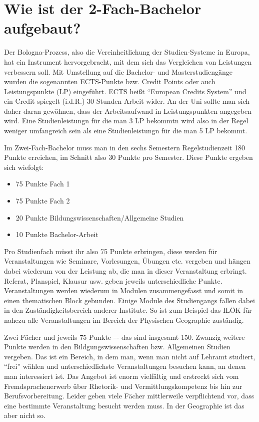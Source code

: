 \section*{Wie ist der 2-Fach-Bachelor aufgebaut?}
Der Bologna-Prozess, also die Vereinheitlichung der Studien-Systeme in Europa, hat ein Instrument hervorgebracht, mit dem sich das Vergleichen von Leistungen verbessern soll. Mit Umstellung auf die Bachelor- und Masterstudiengänge wurden die sogenannten ECTS-Punkte bzw. Credit Points oder auch Leistungspunkte (LP) eingeführt. ECTS heißt "`European Credits System"' und ein Credit spiegelt (i.d.R.) 30 Stunden Arbeit wider. An der Uni sollte man sich daher daran gewöhnen, dass der Arbeitsaufwand in Leistungspunkten angegeben wird. Eine Studienleistungn für die man 3 LP bekommtn wird also in der Regel weniger umfangreich sein als eine Studienleistungn für die man 5 LP bekommt.

Im Zwei-Fach-Bachelor muss man in den sechs Semestern Regelstudienzeit 180 Punkte erreichen, im Schnitt also 30 Punkte pro Semester. Diese Punkte ergeben sich wiefolgt:
\begin{itemize}
\item 75 Punkte Fach 1
\item 75 Punkte Fach 2
\item 20 Punkte Bildungswissenschaften/Allgemeine Studien
\item 10 Punkte Bachelor-Arbeit
\end{itemize}
Pro Studienfach müsst ihr also 75 Punkte erbringen, diese werden für Veranstaltungen wie Seminare, Vorlesungen, Übungen etc. vergeben und hängen dabei wiederum von der Leistung ab, die man in dieser Veranstaltung erbringt. Referat, Planspiel, Klausur usw. geben jeweils unterschiedliche Punkte. Veranstaltungen werden wiederum in Modulen zusammengefasst und somit in einen thematischen Block gebunden. Einige Module des Studiengangs fallen dabei in den Zuständigkeitsbereich anderer Institute. So ist zum Beispiel das ILÖK für nahezu alle Veranstaltungen im Bereich der Physischen Geographie zuständig.

Zwei Fächer und jeweils 75 Punkte –- das sind insgesamt 150. Zwanzig weitere Punkte werden in den Bildgungswissenschaften bzw. Allgemeinen Studien vergeben. Das ist ein Bereich, in dem man, wenn man nicht auf Lehramt studiert, "`frei"' wählen und unterschiedlichste Veranstaltungen besuchen kann, an denen man interessiert ist. Das Angebot ist enorm vielfältig und erstreckt sich vom Fremdsprachenerwerb über Rhetorik- und Vermittlungskompetenz bis hin zur Berufsvorbereitung. Leider geben viele Fächer mittlerweile verpflichtend vor, dass eine bestimmte Veranstaltung besucht werden muss. In der Geographie ist das aber nicht so.

